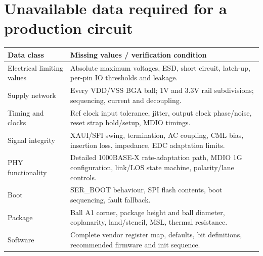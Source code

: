 \documentclass[10pt,a4paper]{article}
\begin{document}
\section{Unavailable data required for a production circuit}
\begin{tabularx}{\linewidth}{@{}p{54mm}X@{}}\toprule
Data class & Missing values / verification condition\\\midrule
Electrical limiting values & Absolute maximum voltages, ESD, short circuit, latch-up, per-pin IO thresholds and leakage.\\
Supply network & Every VDD/VSS BGA ball; 1V and 3.3V rail subdivisions; sequencing, current and decoupling.\\
Timing and clocks & Ref clock input tolerance, jitter, output clock phase/noise, reset strap hold/setup, MDIO timings.\\
Signal integrity & XAUI/SFI swing, termination, AC coupling, CML bias, insertion loss, impedance, EDC adaptation limits.\\
PHY functionality & Detailed 1000BASE-X rate-adaptation path, MDIO 1G configuration, link/LOS state machine, polarity/lane controls.\\
Boot & SER\_BOOT behaviour, SPI flash contents, boot sequencing, fault fallback.\\
Package & Ball A1 corner, package height and ball diameter, coplanarity, land/stencil, MSL, thermal resistance.\\
Software & Complete vendor register map, defaults, bit definitions, recommended firmware and init sequence.\\\bottomrule\end{tabularx}
\end{document}
